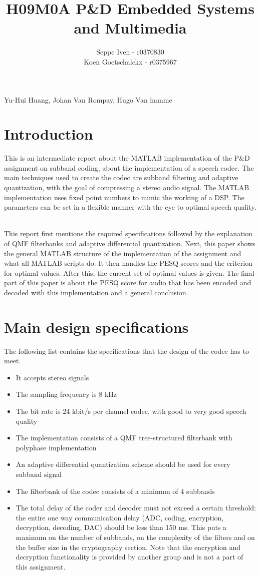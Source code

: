 \documentclass[a4paper]{article}
\title{H09M0A P\&D Embedded Systems and Multimedia}
\author{Seppe Iven - r0370830 \\ Koen Goetschalckx - r0375967}
\begin{document}
 
\maketitle
\begin{center} Yu-Hui Huang, Johan Van Rompay, Hugo Van hamme
\end{center}

\section{Introduction}
This is an intermediate report about the MATLAB implementation of the P\&D assignment on subband coding, about the implementation of a speech codec. The main techniques used to create the codec are subband filtering and adaptive quantization, with the goal of compressing a stereo audio signal. The MATLAB implementation uses fixed point numbers to mimic the working of a DSP. The parameters can be set in a flexible manner with the eye to optimal speech quality. \

This report first mentions the required specifications followed by the explanation of QMF filterbanks and adaptive differential quantization. Next, this paper shows the general MATLAB structure of the implementation of the assignment and what all MATLAB scripts do. It then handles the PESQ scores and the criterion for optimal values. After this, the current set of optimal values is given. The final part of this paper is about the PESQ score for audio that has been encoded and decoded with this implementation and a general conclusion.

\section{Main design specifications}
The following list contains the specifications that the design of the codec has to meet.

\begin{itemize}
\item It accepts stereo signals
\item The sampling frequency is 8 kHz
\item The bit rate is 24 kbit/s per channel codec, with good to very good speech quality
\item The implementation consists of a QMF tree-structured filterbank with polyphase implementation
\item An adaptive differential quantization scheme should be used for every subband signal
\item The filterbank of the codec consists of a minimum of 4 subbands
\item The total delay of the coder and decoder must not exceed a certain threshold: the entire one way communication delay (ADC, coding, encryption, decryption, decoding, DAC) should be less than 150 ms. This puts a maximum on the number of subbands, on the complexity of the filters and on the buffer size in the cryptography section. Note that the encryption and decryption functionality is provided by another group and is not a part of this assignment.

\end{itemize}
\end{document}
